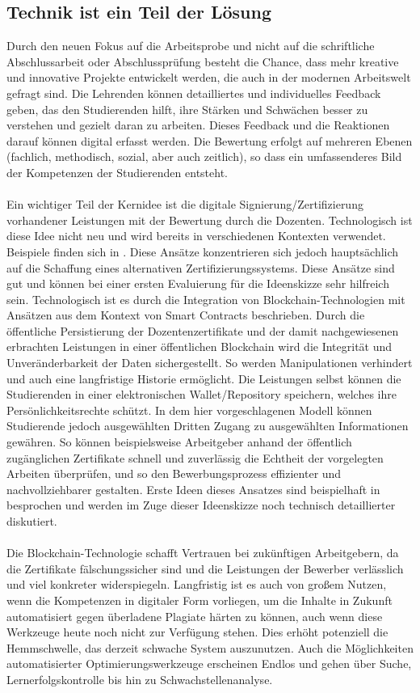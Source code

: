 \documentclass[conference]{IEEEtran}
\begin{document}
\subsection{Technik ist ein Teil der Lösung}
Durch den neuen Fokus auf die Arbeitsprobe und nicht auf die schriftliche Abschlussarbeit oder Abschlussprüfung besteht die Chance, dass mehr kreative und innovative Projekte entwickelt werden, die auch in der modernen Arbeitswelt gefragt sind. Die Lehrenden können detailliertes und individuelles Feedback geben, das den Studierenden hilft, ihre Stärken und Schwächen besser zu verstehen und gezielt daran zu arbeiten. Dieses Feedback und die Reaktionen darauf können digital erfasst werden. Die Bewertung erfolgt auf mehreren Ebenen (fachlich, methodisch, sozial, aber auch zeitlich), so dass ein umfassenderes Bild der Kompetenzen der Studierenden entsteht.
\\\\
Ein wichtiger Teil der Kernidee ist die digitale Signierung/Zertifizierung vorhandener Leistungen mit der Bewertung durch die Dozenten.  Technologisch ist diese Idee nicht neu und wird bereits in verschiedenen Kontexten verwendet. Beispiele finden sich in \cite{alammary2019blockchain}. Diese Ansätze konzentrieren sich jedoch hauptsächlich auf die Schaffung eines alternativen Zertifizierungssystems. Diese Ansätze sind gut und können bei einer ersten Evaluierung für die Ideenskizze sehr hilfreich sein. Technologisch ist  es durch die Integration von Blockchain-Technologien mit Ansätzen aus dem Kontext von Smart Contracts beschrieben. Durch die öffentliche Persistierung der Dozentenzertifikate und der damit nachgewiesenen erbrachten Leistungen in einer öffentlichen Blockchain wird die Integrität und Unveränderbarkeit der Daten sichergestellt. So werden Manipulationen verhindert und auch eine langfristige Historie ermöglicht. Die Leistungen selbst können die Studierenden in einer elektronischen Wallet/Repository speichern, welches ihre Persönlichkeitsrechte schützt. In dem hier vorgeschlagenen Modell können Studierende jedoch ausgewählten Dritten Zugang zu ausgewählten Informationen gewähren.  So können beispielsweise Arbeitgeber anhand der öffentlich zugänglichen Zertifikate schnell und zuverlässig die Echtheit der vorgelegten Arbeiten überprüfen, und so  den Bewerbungsprozess effizienter und nachvollziehbarer gestalten. Erste Ideen dieses Ansatzes sind beispielhaft in \cite{Idee} besprochen und werden im Zuge dieser Ideenskizze noch technisch detaillierter diskutiert.
\\\\
Die Blockchain-Technologie schafft Vertrauen bei zukünftigen Arbeitgebern, da die Zertifikate fälschungssicher sind und die Leistungen der Bewerber verlässlich und viel konkreter widerspiegeln. Langfristig ist es auch von großem Nutzen, wenn die Kompetenzen in digitaler Form vorliegen, um die Inhalte in Zukunft automatisiert gegen überladene Plagiate härten zu können, auch wenn diese Werkzeuge heute noch nicht zur Verfügung stehen. Dies erhöht potenziell die Hemmschwelle, das derzeit schwache System auszunutzen. Auch die Möglichkeiten automatisierter Optimierungswerkzeuge erscheinen Endlos und gehen über Suche, Lernerfolgskontrolle bis hin zu Schwachstellenanalyse. 
\end{document}
